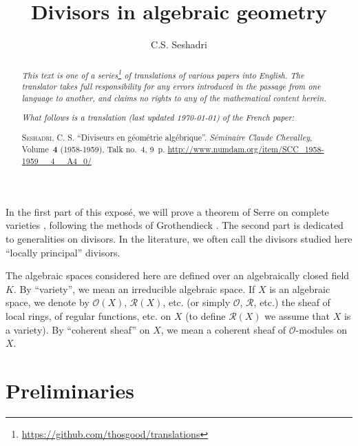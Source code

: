 \documentclass{article}
\theoremstyle{plain}
\theoremstyle{definition}
\newcommand{\sh}{\mathscr}
\newcommand{\oldpage}[1]{\marginpar{\footnotesize$\Big\vert$ \textit{p.~#1}}}
\begin{document}
\renewcommand{\abstractname}{Translator's note.}

\title{Divisors in algebraic geometry}
\author{C.S. Seshadri}
\date{}
\maketitle

\begin{abstract}
  \renewcommand*{\thefootnote}{\fnsymbol{footnote}}
  \emph{This text is one of a series\footnote{\url{https://github.com/thosgood/translations}} of translations of various papers into English.}
  \emph{The translator takes full responsibility for any errors introduced in the passage from one language to another, and claims no rights to any of the mathematical content herein.}
  
  \emph{What follows is a translation (last updated \today) of the French paper:}

  \medskip\noindent
  \textsc{Seshadri, C. S.}
  ``Diviseurs en géométrie algébrique''.
  \emph{Séminaire Claude Chevalley}, Volume~\textbf{4} (1958-1959), Talk no.~4, 9~p.
  {\footnotesize\url{http://www.numdam.org/item/SCC_1958-1959__4__A4_0/}}
\end{abstract}

\setcounter{footnote}{0}

\tableofcontents



\bigskip\bigskip
\oldpage{4-01}
In the first part of this exposé, we will prove a theorem of Serre on complete varieties \cite{6}, following the methods of Grothendieck \cite{4}.
The second part is dedicated to generalities on divisors.
In the literature, we often call the divisors studied here ``locally principal'' divisors.

The algebraic spaces considered here are defined over an algebraically closed field $K$.
By ``variety'', we mean an irreducible algebraic space.
If $X$ is an algebraic space, we denote by $\sh{O}(X)$, $\sh{R}(X)$, etc. (or simply $\sh{O}$, $\sh{R}$, etc.) the sheaf of local rings, of regular functions, etc. on $X$ (to define $\sh{R}(X)$ we assume that $X$ is a variety).
By ``coherent sheaf'' on $X$, we mean a coherent sheaf of $\sh{O}$-modules on $X$.


\section{Preliminaries}
\label{section1}
\end{document}
